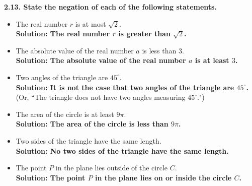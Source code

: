 \documentclass[11pt]{article}
\begin{document}
\vspace{0.5cm}
\textbf{2.13. State the negation of each of the following statements.}
\begin{itemize}
    \item[(a)] The real number $r$ is at most $\sqrt{2}$. \\
    \textbf{Solution: The real number $r$ is greater than $\sqrt{2}$.}
    
    \item[(b)] The absolute value of the real number $a$ is less than $3$. \\
    \textbf{Solution: The absolute value of the real number $a$ is at least $3$.}
    
    \item[(c)] Two angles of the triangle are $45^\circ$. \\
    \textbf{Solution: It is not the case that two angles of the triangle are $45^\circ$.} (Or, ``The triangle does not have two angles measuring $45^\circ$.")
    
    \item[(d)] The area of the circle is at least $9\pi$. \\
    \textbf{Solution: The area of the circle is less than $9\pi$.}
    
    \item[(e)] Two sides of the triangle have the same length. \\
    \textbf{Solution: No two sides of the triangle have the same length.}
    
    \item[(f)] The point $P$ in the plane lies outside of the circle $C$. \\
    \textbf{Solution: The point $P$ in the plane lies on or inside the circle $C$.}
\end{itemize}
\end{document}
